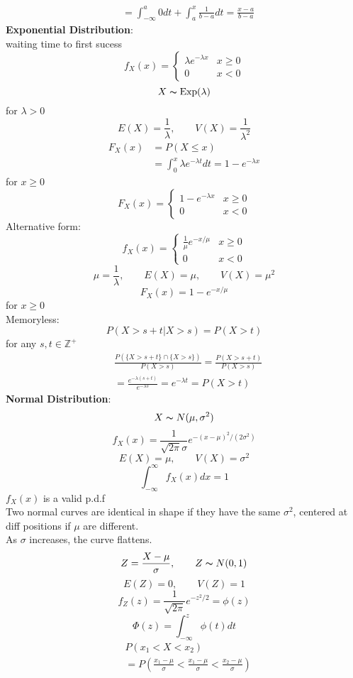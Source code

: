 \documentclass{article}
\begin{document}
\begin{multicols*}{3}
\begin{align*}
&=\int_{-\infty}^a 0dt+\int_a^x\frac{1}{b-a}dt=\frac{x-a}{b-a}
\end{align*}
\textbf{Exponential Distribution}: \\
waiting time to first sucess 
$$f_X(x)=\begin{cases}
    \lambda e^{-\lambda x} & x\geq 0 \\ 0 & x < 0
\end{cases}$$
$$X\thicksim \text{Exp}(\lambda)$$ for $\lambda > 0$ 
$$E(X)=\frac{1}{\lambda}, \qquad V(X)=\frac{1}{\lambda^2}$$
\begin{align*}
F_X(x)&=P(X\leq x)\\
&=\int_0^x \lambda e^{-\lambda t}dt=1-e^{-\lambda x}
\end{align*}
for $x\geq 0$
$$F_X(x)=\begin{cases}
    1-e^{-\lambda x} & x\geq0 \\ 0 & x<0
\end{cases}$$
Alternative form: 
$$f_X(x)=\begin{cases}
    \frac{1}{\mu}e^{-x/\mu} & x\geq 0 \\ 0 & x < 0
\end{cases}$$
$$\mu=\frac{1}{\lambda}, \qquad E(X)=\mu, \qquad V(X)=\mu^2$$
$$F_X(x)=1-e^{-x/\mu}$$
for $x\geq0$\\
Memoryless: $$P(X>s+t|X>s)=P(X>t)$$ for any $s,t\in \mathbb{Z}^+$
\begin{align*}
&\frac{P(\{X>s+t\}\cap\{X>s\})}{P(X>s)}=\frac{P(X>s+t)}{P(X>s)}\\
&=\frac{e^{-\lambda (s+t)}}{e^{-\lambda s}}=e^{-\lambda t}=P(X>t)
\end{align*}
\textbf{Normal Distribution}: \\
$$X\thicksim N(\mu,\sigma^2)$$
$$f_X(x)=\frac{1}{\sqrt{2\pi}\sigma}e^{-(x-\mu)^2/(2\sigma^2)}$$
$$E(X)=\mu, \qquad V(X)=\sigma^2$$
$$\int^\infty_{-\infty}f_X(x)dx=1$$
$f_X(x)$ is a valid p.d.f\\
Two normal curves are identical in shape if they have the same $\sigma^2$, centered at diff positions if $\mu$ are different.\\
As $\sigma$ increases, the curve flattens.\\
$$Z=\frac{X-\mu}{\sigma}, \qquad Z\thicksim N(0,1)$$ 
$$E(Z)=0, \qquad V(Z)=1$$
$$f_Z(z)=\frac{1}{\sqrt{2\pi}}e^{-z^2/2}=\phi(z)$$
$$\Phi(z)=\int_{-\infty}^z \phi(t)dt$$
\begin{align*}
&P(x_1<X<x_2)\\
&=P(\frac{x_1-\mu}{\sigma}<\frac{x_1-\mu}{\sigma}<\frac{x_2-\mu}{\sigma})\\

\end{align*}
\end{multicols*}
\end{document}
